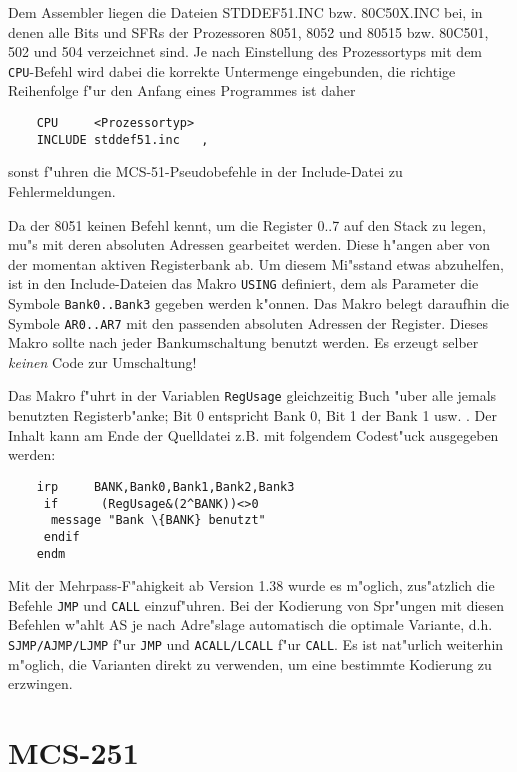 \documentclass[12pt,a4paper,twoside]{report}
\newcommand{\ii}[1]{{\it #1}}
\newcommand{\tty}[1]{{\tt #1}}
\begin{document}
{Dem Assembler liegen die Dateien STDDEF51.INC bzw. 80C50X.INC bei, in
denen alle Bits und SFRs der Prozessoren 8051, 8052 und 80515 bzw. 80C501,
502 und 504 verzeichnet sind.  Je nach Einstellung des Prozessortyps mit
dem \tty{CPU}-Befehl wird dabei die korrekte Untermenge eingebunden, die
richtige Reihenfolge f"ur den Anfang eines Programmes ist daher
\begin{verbatim}
	CPU     <Prozessortyp>
	INCLUDE stddef51.inc   ,
\end{verbatim}
sonst f"uhren die MCS-51-Pseudobefehle in der Include-Datei zu
Fehlermeldungen.
\par
Da der 8051 keinen Befehl kennt, um die Register 0..7 auf den Stack zu
legen, mu"s mit deren absoluten Adressen gearbeitet werden.  Diese
h"angen aber von der momentan aktiven Registerbank ab.  Um diesem Mi"sstand
etwas abzuhelfen, ist in den Include-Dateien das Makro \tty{USING} definiert,
dem als Parameter die Symbole \tty{Bank0..Bank3} gegeben werden k"onnen.
Das Makro belegt daraufhin die Symbole \tty{AR0..AR7} mit den passenden
absoluten Adressen der Register.  Dieses Makro sollte nach jeder
Bankumschaltung benutzt werden.  Es erzeugt selber \ii{keinen} Code zur
Umschaltung!
\par
Das Makro f"uhrt in der Variablen \tty{RegUsage} gleichzeitig Buch "uber
alle jemals benutzten Registerb"anke; Bit 0 entspricht Bank 0, Bit 1 der
Bank 1 usw. .  Der Inhalt kann am Ende der Quelldatei z.B. mit folgendem
Codest"uck ausgegeben werden:
\begin{verbatim}
	irp     BANK,Bank0,Bank1,Bank2,Bank3
	 if      (RegUsage&(2^BANK))<>0
	  message "Bank \{BANK} benutzt"
	 endif
	endm
\end{verbatim}
Mit der Mehrpass-F"ahigkeit ab Version 1.38 wurde es m"oglich, zus"atzlich
die Befehle \tty{JMP} und \tty{CALL} einzuf"uhren.  Bei der Kodierung
von Spr"ungen mit diesen Befehlen w"ahlt AS je nach Adre"slage automatisch
die optimale Variante, d.h. \tty{SJMP/AJMP/LJMP} f"ur \tty{JMP} und
\tty{ACALL/LCALL} f"ur \tty{CALL}.  Es ist nat"urlich weiterhin m"oglich,
die Varianten direkt zu verwenden, um eine bestimmte Kodierung zu erzwingen.


\section{MCS-251}

}
\end{document}
